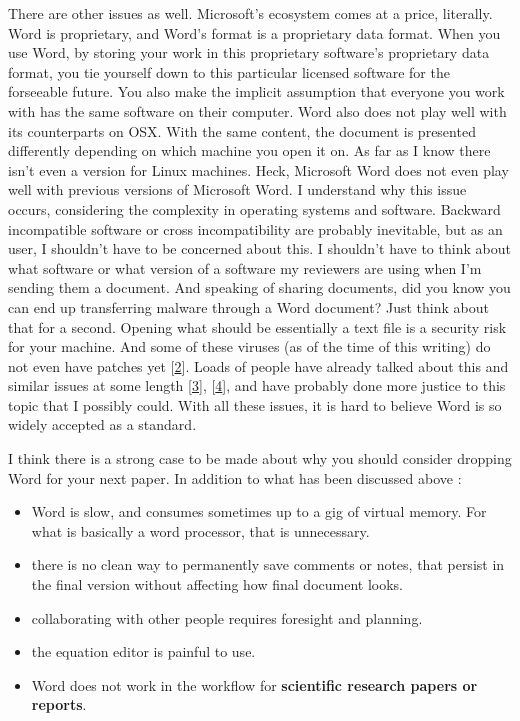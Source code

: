 \documentclass[journal,10pt,final]{IEEEtran}
\providecommand{\tightlist}{%
  \setlength{\itemsep}{0pt}\setlength{\parskip}{0pt}}
\begin{document}
There are other issues as well. Microsoft's ecosystem comes at a price,
literally. Word is proprietary, and Word's format is a proprietary data
format. When you use Word, by storing your work in this proprietary
software's proprietary data format, you tie yourself down to this
particular licensed software for the forseeable future. You also make
the implicit assumption that everyone you work with has the same
software on their computer. Word also does not play well with its
counterparts on OSX. With the same content, the document is presented
differently depending on which machine you open it on. As far as I know
there isn't even a version for Linux machines. Heck, Microsoft Word does
not even play well with previous versions of Microsoft Word. I
understand why this issue occurs, considering the complexity in
operating systems and software. Backward incompatible software or cross
incompatibility are probably inevitable, but as an user, I shouldn't
have to be concerned about this. I shouldn't have to think about what
software or what version of a software my reviewers are using when I'm
sending them a document. And speaking of sharing documents, did you know
you can end up transferring malware through a Word document? Just think
about that for a second. Opening what should be essentially a text file
is a security risk for your machine. And some of these viruses (as of
the time of this writing) do not even have patches yet
{[}\protect\hyperlink{ref-beaumontux5fbypassux5f2015}{2}{]}. Loads of
people have already talked about this and similar issues at some length
{[}\protect\hyperlink{ref-steingoldux5fproprietary}{3}{]},
{[}\protect\hyperlink{ref-cottrellux5fword}{4}{]}, and have probably
done more justice to this topic that I possibly could. With all these
issues, it is hard to believe Word is so widely accepted as a standard.

I think there is a strong case to be made about why you should consider
dropping Word for your next paper. In addition to what has been
discussed above :

\begin{itemize}
\tightlist
\item
  Word is slow, and consumes sometimes up to a gig of virtual memory.
  For what is basically a word processor, that is unnecessary.
\item
  there is no clean way to permanently save comments or notes, that
  persist in the final version without affecting how final document
  looks.
\item
  collaborating with other people requires foresight and planning.
\item
  the equation editor is painful to use.
\item
  Word does not work in the workflow for \textbf{scientific research
  papers or reports}.
\end{itemize}
\end{document}
